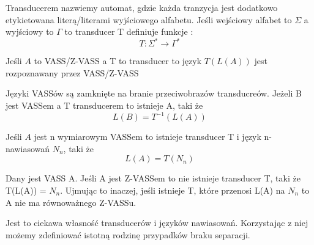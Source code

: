     \begin{definition}
        Transducerem nazwiemy automat,  gdzie każda tranzycja
        jest dodatkowo etykietowana literą/literami wyjściowego alfabetu.
        Jeśli wejściowy alfabet to $\Sigma$ a wyjściowy to $\Gamma$ to transducer T definiuje funkcje :
        \[T:\Sigma ^* \rightarrow \Gamma ^*\]
    \end{definition}

    \begin{lemma}
        Jeśli $A$ to VASS/Z-VASS a T to transducer to język $T(L(A))$ jest rozpoznawany przez VASS/Z-VASS
    \end{lemma}

    \begin{lemma}
        \label{transducer_rev_im}
        Języki VASSów są zamknięte na branie przeciwobrazów transducreów.
        Jeżeli B jest VASSem a T transducerem to istnieje A, taki że
        \[L(B) = T^{-1}(L(A))\]
    \end{lemma}

    \begin{lemma}
        Jeśli $A$ jest n wymiarowym VASSem to istnieje transducer T i język n-nawiasowań $N_n$, taki że
        \[L(A) = T(N_n)\]
    \end{lemma}

    \begin{lemma}
        Dany jest VASS A.
        Jeśli A jest Z-VASSem to nie istnieje transducer T, taki że T(L(A)) = $N_n$.
        Ujmując to inaczej, jeśli istnieje T, które przenosi L(A) na $N_n$ to A nie ma równoważnego Z-VASSu.
    \end{lemma}

    Jest to ciekawa własność transducerów i języków nawiasowań.
    Korzystając z niej możemy zdefiniować istotną rodzinę przypadków braku separacji.

